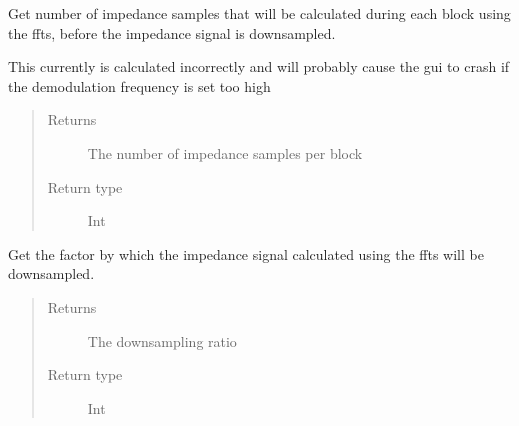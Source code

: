 \documentclass[letterpaper,10pt,english]{sphinxmanual}
\begin{document}
\begin{fulllineitems}

\begin{fulllineitems}
\label{\detokenize{index:TiePieLCR_settings.TiePieLCR_settings.get_output_block_size}}
\sphinxAtStartPar
Get number of impedance samples that will be calculated during each block using the ffts, before the impedance signal is downsampled.

\sphinxAtStartPar
This currently is calculated incorrectly and will probably cause the gui to crash if the demodulation frequency is set too high
\begin{quote}\begin{description}
\item[{Returns}] \leavevmode
\sphinxAtStartPar
The number of impedance samples per block

\item[{Return type}] \leavevmode
\sphinxAtStartPar
Int

\end{description}\end{quote}

\end{fulllineitems}


\begin{fulllineitems}
\label{\detokenize{index:TiePieLCR_settings.TiePieLCR_settings.get_output_downsampling_rate}}
\sphinxAtStartPar
Get the factor by which the impedance signal calculated using the ffts will be downsampled.
\begin{quote}\begin{description}
\item[{Returns}] \leavevmode
\sphinxAtStartPar
The downsampling ratio

\item[{Return type}] \leavevmode
\sphinxAtStartPar
Int

\end{description}\end{quote}


\end{fulllineitems}
\end{fulllineitems}
\end{document}
